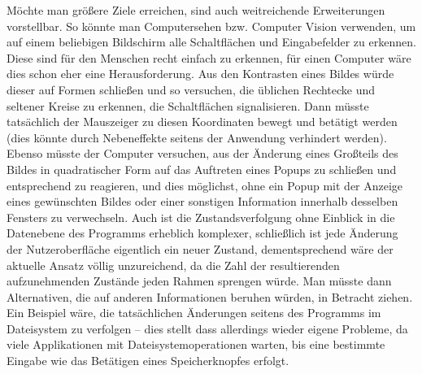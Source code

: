 Möchte man größere Ziele erreichen, sind auch weitreichende
Erweiterungen vorstellbar. So könnte man Computersehen bzw.
Computer Vision verwenden, um auf einem beliebigen Bildschirm
alle Schaltflächen und Eingabefelder zu erkennen. Diese sind
für den Menschen recht einfach zu erkennen, für einen
Computer wäre dies schon eher eine Herausforderung. Aus den
Kontrasten eines Bildes würde dieser auf Formen schließen
und so versuchen, die üblichen Rechtecke und seltener Kreise
zu erkennen, die Schaltflächen signalisieren. Dann müsste
tatsächlich der Mauszeiger zu diesen Koordinaten bewegt
und betätigt werden (dies könnte durch Nebeneffekte seitens
der Anwendung verhindert werden). Ebenso müsste der Computer
versuchen, aus der Änderung eines Großteils des Bildes
in quadratischer Form auf das Auftreten eines Popups zu 
schließen und entsprechend zu reagieren, und dies möglichst,
ohne ein Popup mit der Anzeige eines gewünschten Bildes
oder einer sonstigen Information innerhalb desselben
Fensters zu verwechseln. Auch ist die Zustandsverfolgung
ohne Einblick in die Datenebene des Programms erheblich
komplexer, schließlich ist jede Änderung der
Nutzeroberfläche eigentlich ein neuer Zustand,
dementsprechend wäre der aktuelle Ansatz völlig
unzureichend, da die Zahl der resultierenden
aufzunehmenden Zustände jeden Rahmen sprengen
würde. Man müsste dann Alternativen, die auf anderen
Informationen beruhen würden, in Betracht ziehen.
Ein Beispiel wäre, die tatsächlichen Änderungen
seitens des Programms im Dateisystem zu verfolgen
-- dies stellt dass allerdings wieder eigene
Probleme, da viele Applikationen mit
Dateisystemoperationen warten, bis eine
bestimmte Eingabe wie das Betätigen
eines Speicherknopfes erfolgt.
